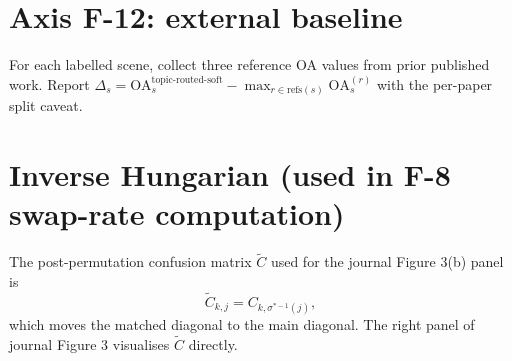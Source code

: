 \documentclass[11pt,a4paper]{article}
\begin{document}
\section{Axis F-12: external baseline}
For each labelled scene, collect three reference OA values from
prior published work. Report
$\Delta_s = \text{OA}_s^{\text{topic-routed-soft}}
- \max_{r \in \text{refs}(s)} \text{OA}_s^{(r)}$
with the per-paper split caveat.

\section{Inverse Hungarian (used in F-8 swap-rate computation)}
The post-permutation confusion matrix $\tilde{C}$ used for the
journal Figure 3(b) panel is
\begin{equation}
\tilde{C}_{k, j} = C_{k, \sigma^{*-1}(j)},
\end{equation}
which moves the matched diagonal to the main diagonal. The right
panel of journal Figure 3 visualises $\tilde{C}$ directly.



\end{document}
